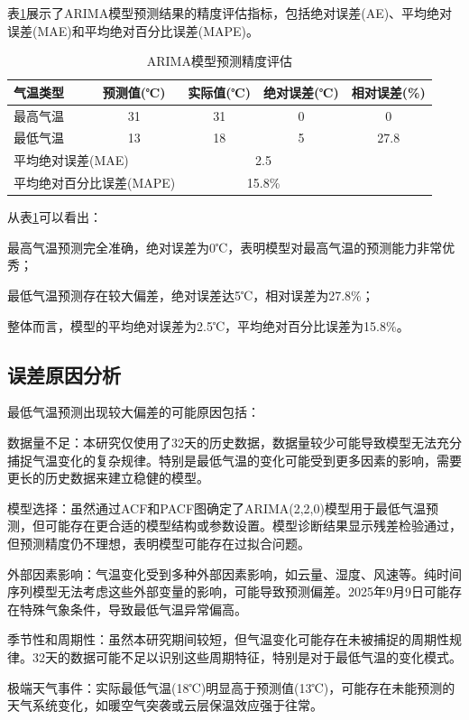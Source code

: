 \documentclass[withoutpreface,bwprint]{cumcmthesis} %
\begin{document}
表\ref{tab:accuracy}展示了ARIMA模型预测结果的精度评估指标，包括绝对误差(AE)、平均绝对误差(MAE)和平均绝对百分比误差(MAPE)。

\begin{table}[H]
    \centering
    \caption{ARIMA模型预测精度评估}
    \label{tab:accuracy}
    \begin{tabular}{lcccc}
    \toprule
    气温类型 & 预测值(℃) & 实际值(℃) & 绝对误差(℃) & 相对误差(\%) \\
    \midrule
    最高气温 & 31 & 31 & 0 & 0 \\
    最低气温 & 13 & 18 & 5 & 27.8 \\
    \midrule
    \multicolumn{2}{l}{平均绝对误差(MAE)} & \multicolumn{2}{c}{2.5} & \\
    \multicolumn{2}{l}{平均绝对百分比误差(MAPE)} & \multicolumn{2}{c}{15.8\%} & \\
    \bottomrule
    \end{tabular}
    \end{table}

从表\ref{tab:accuracy}可以看出：

最高气温预测完全准确，绝对误差为0℃，表明模型对最高气温的预测能力非常优秀；

最低气温预测存在较大偏差，绝对误差达5℃，相对误差为27.8\%；

整体而言，模型的平均绝对误差为2.5℃，平均绝对百分比误差为15.8\%。

\subsection{误差原因分析}
最低气温预测出现较大偏差的可能原因包括：

数据量不足：本研究仅使用了32天的历史数据，数据量较少可能导致模型无法充分捕捉气温变化的复杂规律。特别是最低气温的变化可能受到更多因素的影响，需要更长的历史数据来建立稳健的模型。

模型选择：虽然通过ACF和PACF图确定了ARIMA(2,2,0)模型用于最低气温预测，但可能存在更合适的模型结构或参数设置。模型诊断结果显示残差检验通过，但预测精度仍不理想，表明模型可能存在过拟合问题。

外部因素影响：气温变化受到多种外部因素影响，如云量、湿度、风速等。纯时间序列模型无法考虑这些外部变量的影响，可能导致预测偏差。2025年9月9日可能存在特殊气象条件，导致最低气温异常偏高。

季节性和周期性：虽然本研究期间较短，但气温变化可能存在未被捕捉的周期性规律。32天的数据可能不足以识别这些周期特征，特别是对于最低气温的变化模式。

极端天气事件：实际最低气温(18℃)明显高于预测值(13℃)，可能存在未能预测的天气系统变化，如暖空气突袭或云层保温效应强于往常。
\end{document}
